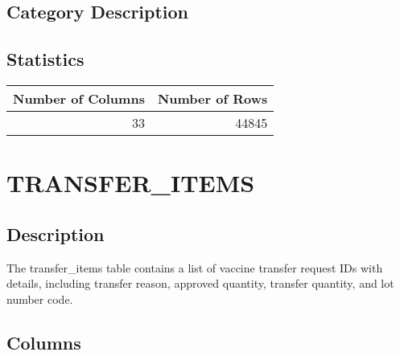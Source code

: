 \documentclass[
  letterpaper,
  DIV=11,
  numbers=noendperiod]{scrreprt}
\begin{document}
\hypertarget{category-description-40}{%
\section*{Category Description}\label{category-description-40}}

\hypertarget{statistics-40}{%
\section*{Statistics}\label{statistics-40}}

\begin{longtable}{rr}
\toprule
Number of Columns & Number of Rows \\ 
\midrule
33 & 44845 \\ 
\bottomrule
\end{longtable}

\hypertarget{transfer_items}{%
\chapter*{TRANSFER\_ITEMS}\label{transfer_items}}

\hypertarget{description-41}{%
\section*{Description}\label{description-41}}

The transfer\_items table contains a list of vaccine transfer request
IDs with details, including transfer reason, approved quantity, transfer
quantity, and lot number code.

\hypertarget{columns-41}{%
\section*{Columns}\label{columns-41}}
\end{document}
